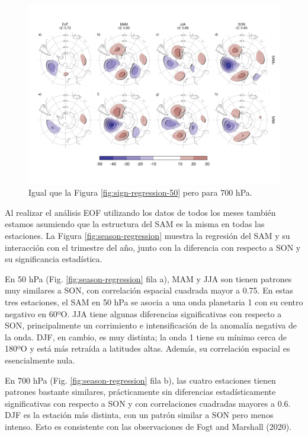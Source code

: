 \documentclass[12pt,oneside]{reedthesis}
\begin{document}
\begin{figure}
\includegraphics{figures/30-sam/sign-regression-700-1} \caption{Igual que la Figura \ref{fig:sign-regression-50} pero para 700 hPa.}\label{fig:sign-regression-700}
\end{figure}

Al realizar el análisis EOF utilizando los datos de todos los meses también estamos asumiendo que la estructura del SAM es la misma en todas las estaciones.
La Figura \ref{fig:season-regression} muestra la regresión del SAM y su interacción con el trimestre del año, junto con la diferencia con respecto a SON y su significancia estadística.

En 50 hPa (Fig. \ref{fig:season-regression} fila a), MAM y JJA son tienen patrones muy similares a SON, con correlación espacial cuadrada mayor a 0.75.
En estas tres estaciones, el SAM en 50 hPa se asocia a una onda planetaria 1 con su centro negativo en 60ºO.
JJA tiene algunas diferencias significativas con respecto a SON, principalmente un corrimiento e intensificación de la anomalía negativa de la onda.
DJF, en cambio, es muy distinta; la onda 1 tiene su mínimo cerca de 180ºO y está más retraída a latitudes altas.
Además, su correlación espacial es esencialmente nula.

En 700 hPa (Fig. \ref{fig:season-regression} fila b), las cuatro estaciones tienen patrones bastante similares, prácticamente sin diferencias estadísticamente significativas con respecto a SON y con correlaciones cuadradas mayores a 0.6.
DJF es la estación más distinta, con un patrón similar a SON pero menos intenso.
Esto es consistente con las observaciones de Fogt and Marshall (2020).
\end{document}
